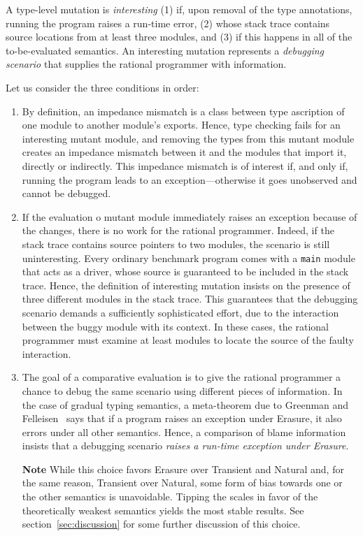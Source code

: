
A type-level mutation is {\em interesting\/} (1) if, upon removal of the type
annotations, running the program raises a run-time error, (2) whose stack trace
contains source locations from at least three modules, and (3) if this happens
in all of the to-be-evaluated semantics. An interesting mutation represents a
{\em debugging scenario\/} that supplies the rational programmer with
information.

Let us consider the three conditions in order:
\begin{enumerate}

\item By definition, an impedance mismatch is a class between type ascription of
one module to another module's exports. Hence, type checking fails for an
interesting mutant module, and removing the types from this mutant module
creates an impedance mismatch between it and the modules that import it,
directly or indirectly. This impedance mismatch is of interest if, and only if,
running the program leads to an exception---otherwise it goes unobserved and
cannot be debugged.

\item If the evaluation o mutant module immediately raises an exception because
of the changes, there is no work for the rational programmer. Indeed, if the
stack trace contains source pointers to two modules, the scenario is still
uninteresting. Every ordinary benchmark program comes with a {\tt main} module
that acts as a driver, whose source is guaranteed to be included in the stack
trace.  Hence, the definition of interesting mutation insists on the presence of
three different modules in the stack trace. This guarantees that the debugging
scenario demands a sufficiently sophisticated effort, due to the interaction
between the buggy module with its context.  In these cases, the rational
programmer must examine at least modules to locate the source of the faulty
interaction.

\item The goal of a comparative evaluation is to give the rational programmer a
chance to debug the same scenario using different pieces of information.  In the
case of gradual typing semantics, a meta-theorem due to Greenman and
Felleisen~\cite{gf-icfp-2018} says that if a program raises an exception under
Erasure, it also errors under all other semantics.  Hence, a comparison of blame
information insists that a debugging scenario {\em raises a run-time exception
under Erasure\/}.

{\bf Note} While this choice favors Erasure over Transient and Natural and, for
the same reason, Transient over Natural, some form of bias towards one or the
other semantics is unavoidable. Tipping the scales in favor of the theoretically
weakest semantics yields the most stable results. See
section~\ref{sec:discussion} for some further discussion of this choice.

\end{enumerate}


